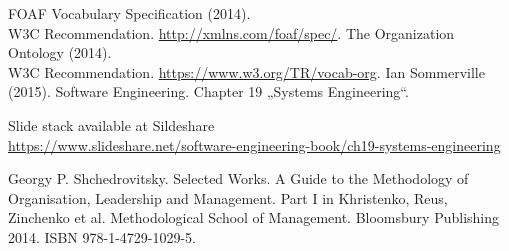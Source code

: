 \documentclass[11pt,a4paper]{article}
\begin{document}
\begin{thebibliography}{xxx}

 FOAF Vocabulary Specification (2014).\\ W3C Recommendation.
  \url{http://xmlns.com/foaf/spec/}.
 The Organization Ontology (2014).\\  W3C Recommendation.
  \url{https://www.w3.org/TR/vocab-org}.
 Ian Sommerville (2015). Software Engineering.
  Chapter 19 „Systems Engineering“.

  Slide stack available at Sildeshare\\{\small
  \url{https://www.slideshare.net/software-engineering-book/ch19-systems-engineering}}

 Georgy P. Shchedrovitsky.  Selected Works. A Guide to the
  Methodology of Organisation, Leadership and Management. Part I in
  Khristenko, Reus, Zinchenko et al.  Methodological School of Management.
  Bloomsbury Publishing 2014.  ISBN 978-1-4729-1029-5.
\end{thebibliography}
\end{document}
